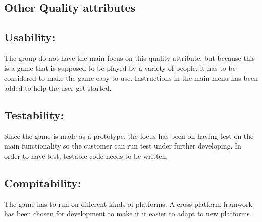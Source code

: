 \subsection{Other Quality attributes}
\subsection*{Usability: } The group do not have the main focus on this quality attribute, but because this is a game that is supposed to be played by a variety of people, it has to be considered to make the game easy to use. Instructions in the main menu has been added to help the user get started.\cite{attributes}

\subsection*{Testability: } Since the game is made as a prototype, the focus has been on having
test on the main functionality so the customer can run test under further developing.
In order to have test, testable code needs to be written.\cite{attributes}

\subsection*{Compitability: } The game has to run on different kinds of platforms. A cross-platform framwork has been chosen for development to make it it easier to adapt to new platforms.
